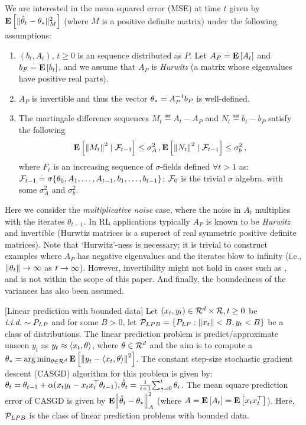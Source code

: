 We are interested in the mean squared error (MSE) at time $t$ given by $\EE{\normsm{\thh_t-\ts}^2_M}$ (where $M$ is a positive definite matrix) under the following assumptions:
\begin{assumption}\label{assmp:lsa}
\begin{enumerate}[leftmargin=*, before = \leavevmode\vspace{-\baselineskip}]
\item \label{dist} $(b_t, A_t)$, $t\geq 0$ is an \iid sequence distributed as $P$. Let $A_P\eqdef\EE{A_t}$ and $b_P\eqdef\EE{b_t}$, and we assume that $A_P$ is \emph{Hurwitz} (a matrix whose eigenvalues have positive real parts).
\item $A_P$ is invertible and thus the vector $\ts=A^{-1}_Pb_P$ is well-defined.
\item \label{matvar}  The martingale difference sequences $M_t\eqdef A_t-A_{P}$ and $N_t\eqdef b_t-b_{P}$ satisfy the following 
\begin{align*}
	\EE{\norm{M_t}^2\mid\F_{t-1}}\leq \sigma^2_{A}\,, 
\EE{\norm{N_t}^2\mid\F_{t-1}} \leq\sigma^2_{b}\,,
\end{align*} 
where $F_t$ is an increasing sequence of $\sigma$-fields defined $\forall t > 1$ as: $\F_{t-1}\eqdef\sigma\{\theta_0,A_1,\ldots, A_{t-1}, b_1,\ldots, b_{t-1}\}$; $\F_{0}$ is the trivial $\sigma$ algebra.
with some $\sigma^2_{A}$ and $\sigma^2_{b}$. 
\end{enumerate}
\end{assumption}
Here we consider the \emph{multiplicative noise} case, where the noise in $A_t$ multiplies with the iterates $\theta_{t-1}$. In RL applications typically $A_P$ is known to be \emph{Hurwitz} and invertible (Hurwtiz matrices is a superset of real symmetric positive definite matrices). Note that `Hurwitz'-ness is necessary; it is trivial to construct examples where $A_P$ has negative eigenvalues and the iterates blow to infinity (i.e., $\norm{\theta_t}\ra\infty$ as $t\ra\infty$). However, invertibility might not hold in cases such as \cite{bertstab}, and is not within the scope of this paper. And finally, the boundedness of the variances has also been assumed. 
\begin{example}\label{ex:linpred}[Linear prediction with bounded data]
Let $(x_t,y_t)\in \R^{d}\times \R, t\geq 0$ be $\iid \sim P_{LP}$ and for some $B>0$, let $\P_{LPB}=\{  P_{LP}: \norm{x_t}<B, y_t<B \}$ be a class of distributions. The linear prediction problem is predict/approximate unseen $y_t$ as $y_t\approx \ip{x_t,\theta}$, where $\theta\in\R^d$ and the aim is to compute a $\ts=\arg\min_{\theta\in\R^d} \EE{\norm{y_t-\ip{x_t,\theta}}^2}$. The constant step-size stochastic gradient descent (CASGD) algorithm for this problem is given by: $
\theta_t=\theta_{t-1}+\alpha(x_t y_t-x_tx_t^\top\theta_{t-1}), \thh_t=\frac{1}{t+1}{\sum}_{s=0}^{t}\,\theta_i$. The mean square prediction error of CASGD is given by $\E{\norm{\thh_t-\ts}^2_A}$ (where $A=\EE{A_t}=\EE{x_tx_t^\top}$). Here, $\P_{LPB}$ is the class of linear prediction problems with bounded data.
\end{example}
